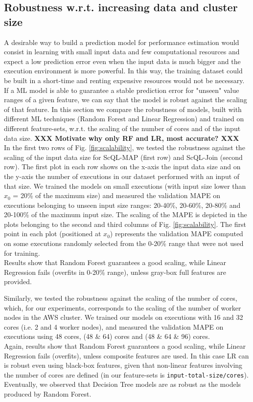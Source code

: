 \documentclass[a4paper, 10pt, conference]{ieeeconf}      %
\begin{document}
\subsection{Robustness w.r.t. increasing data and cluster size}
A desirable way to build a prediction model for performance estimation would consist in learning with small input data and few computational resources and expect a low prediction error even when the input data is much bigger and the execution environment is more powerful. In this way, the training dataset could be built in a short-time and renting expensive resources would not be necessary.
If a ML model is able to guarantee a stable prediction error for "unseen" value ranges of a given feature, we can say that the model is robust against the scaling of that feature.
In this section we compare the robustness of models, built with different  ML techniques (Random Forest and Linear Regression) and trained on different feature-sets, w.r.t. the scaling of the number of cores and of the input data size. \textbf{XXX Motivate why only RF and LR, most accurate? XXX} \\
In the first two rows of Fig. \ref{fig:scalability}, we tested the robustness against the scaling of the input data size for ScQL-MAP (first row) and ScQL-Join (second row). The first plot in each row shows on the x-axis the input data size and on the y-axis the number of executions in our dataset performed with an input of that size.
We trained the models on small executions (with input size lower than $x_0$ = 20\% of the maximum size) and measured the validation MAPE on executions belonging to unseen input size ranges: 20-40\%, 20-60\%, 20-80\% and 20-100\% of the maximum input size.
The scaling of the MAPE is depicted in the plots belonging to the second and third columns of Fig. \ref{fig:scalability}. The first point in each plot (positioned at $x_0$) represents the validation MAPE computed on some executions randomly selected  from the 0-20\% range that were not used for training. \\
Results show that Random Forest guarantees a good scaling, while Linear Regression fails (overfits in 0-20\% range), unless gray-box full features are provided. 

Similarly, we tested the robustness against the scaling of the number of cores, which, for our experiments, corresponds to the scaling of the number of worker nodes in the AWS cluster. We trained our models on executions with 16 and 32 cores (i.e. 2 and 4 worker nodes), and measured the validation MAPE on executions using 48 cores, (48 \& 64) cores and (48 \& 64 \& 96) cores.\\
Again, results show that Random Forest guarantees a good scaling, while Linear Regression fails (overfits), unless composite features are used. In this case LR can is robust even using black-box features, given that non-linear features involving the number of cores are defined (in our feature-sets is \texttt{input-total-size/cores}).
\color{blue}
Eventually, we observed that Decision Tree models are as robust as the models produced by Random Forest.
\color{black}
\end{document}
